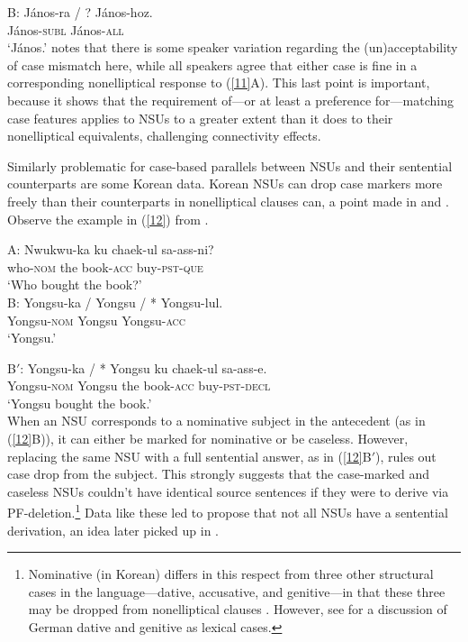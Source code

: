 {B: \gll J\'{a}nos-ra / ? J\'{a}nos-hoz.\\
        J\'{a}nos-\textsc{subl} {} {} J\'{a}nos-\textsc{all}\\
\glt  `J\'{a}nos.'\label{11}
\z
%
\citet{Jacobson2016} notes that there is some speaker variation regarding the (un)ac\-cepta\-bi\-li\-ty of case mismatch here, while all speakers agree that either case is fine in a corresponding nonelliptical response to (\ref{11}A). This last point is important, because it shows that the requirement of---or at least a preference for---matching case features applies to NSUs to a greater extent than it does to their nonelliptical equivalents, challenging connectivity effects.

Similarly problematic for case-based parallels between NSUs and their sentential counterparts are some Korean data. Korean NSUs can drop case markers more freely than their counterparts in nonelliptical clauses can, a point made in \citet{Morgan1989} and \citet{Kim2015}. Observe the example in (\ref{12}) from \citet[237]{Morgan1989}.

  \ea
A: \gll Nwukwu-ka        ku  chaek-ul          sa-ass-ni?\\
        who-\textsc{nom} the book-\textsc{acc} buy-\textsc{pst}-\textsc{que}\\
\glt  `Who bought the book?'\\

B: \gll Yongsu-ka / Yongsu / * Yongsu-lul.\\
        Yongsu-\textsc{nom} {} Yongsu {} {} Yongsu-\textsc{acc}\\
\glt  `Yongsu.'

B$'$: \gll Yongsu-ka            /  *  Yongsu ku  chaek-ul          sa-ass-e.\\
           Yongsu-\textsc{nom}  {} {} Yongsu the book-\textsc{acc} buy-\textsc{pst}-\textsc{decl}\\
\glt  `Yongsu bought the book.'\\
\label{12}
\z
%
When an NSU  corresponds to a nominative subject in the antecedent (as in (\ref{12}B)), it can either be marked for nominative or be caseless.
However, replacing the same NSU  with a full sentential answer, as in (\ref{12}B$'$), rules out case drop from the subject. This strongly suggests that the case-marked and caseless NSUs couldn't have identical source sentences if they were to derive via PF-deletion.\footnote{Nominative (in Korean) differs in this respect from three other structural cases in the language---dative, accusative, and genitive---in that these three may be dropped from nonelliptical clauses \citep[see][]{Morgan1989, Lee2016, Kim2016}. However, see \citet{Mueller2002b} for a discussion of German dative and genitive as lexical cases.}  Data like these led \citet{Morgan1989} to propose that not all NSUs have a sentential derivation, an idea later picked up in \citet{Barton1998}.

}
